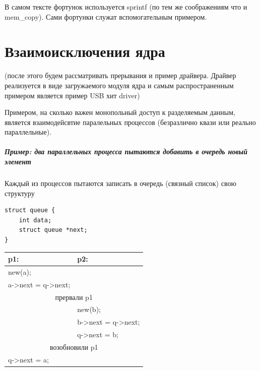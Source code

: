 В самом тексте фортунок используется sprintf (по тем же соображениям что и mem\_copy). Сами фортунки служат вспомогательным примером.


\chapter{Взаимоисключения ядра}

(после этого будем рассматривать прерывания и пример драйвера. Драйвер реализуется в виде загружаемого модуля ядра и самым распространенным примером является пример USB хит driver)

Примером, на сколько важен монопольный доступ к разделяемым данным, является взаимодейсвтие паралельных процессов (безразлично квази или реально параллельные).

\paragraph{Пример: два параллельных  процесса пытаются добавить в очередь новый элемент}

Каждый из процессов пытаются записать в очередь (связный список) свою структуру
\begin{lstlisting}[caption=Структура queue]
struct queue {
	int data;
	struct queue *next;
}
\end{lstlisting}


\begin{table}[H]
\begin{tabular}{|l|l|}
\hline
p1: & p2: \\
\hline
new(a); & \\
a->next = q->next;  & \\
\hline
\multicolumn{2}{|c|}{прервали p1} \\
\hline
 & new(b); \\
 & b->next = q->next; \\
 & q->next = b; \\
\hline
\multicolumn{2}{|c|}{возобновили p1} \\
\hline
q->next = a; & \\
\hline
\end{tabular}
\end{table}

